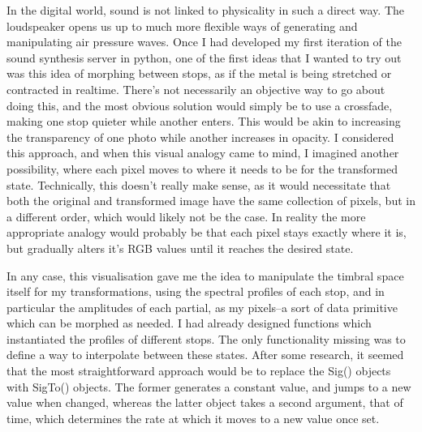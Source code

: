 \documentclass[12pt,twoside,maitrise]{dms_ks}
\theoremstyle{definition}
\begin{document}
In the digital world, sound is not linked to physicality in such a direct way.
The loudspeaker opens us up to much more flexible ways of generating and manipulating air pressure waves.
Once I had developed my first iteration of the sound synthesis server in python, one of the first ideas that I wanted to try out was this idea of morphing between stops, as if the metal is being stretched or contracted in realtime.
There's not necessarily an objective way to go about doing this, and the most obvious solution would simply be to use a crossfade, making one stop quieter while another enters.
This would be akin to increasing the transparency of one photo while another increases in opacity.
I considered this approach, and when this visual analogy came to mind, I imagined another possibility, where each pixel moves to where it needs to be for the transformed state.
Technically, this doesn't really make sense, as it would necessitate that both the original and transformed image have the same collection of pixels, but in a different order, which would likely not be the case.
In reality the more appropriate analogy would probably be that each pixel stays exactly where it is, but gradually alters it's RGB values until it reaches the desired state.

In any case, this visualisation gave me the idea to manipulate the timbral space itself for my transformations, using the spectral profiles of each stop, and in particular the amplitudes of each partial, as my pixels--a sort of data primitive which can be morphed as needed.
I had already designed functions which instantiated the profiles of different stops.
The only functionality missing was to define a way to interpolate between these states.
After some research, it seemed that the most straightforward approach would be to replace the Sig() objects with SigTo() objects.
The former generates a constant value, and jumps to a new value when changed, whereas the latter object takes a second argument, that of time, which determines the rate at which it moves to a new value once set.
\end{document}
